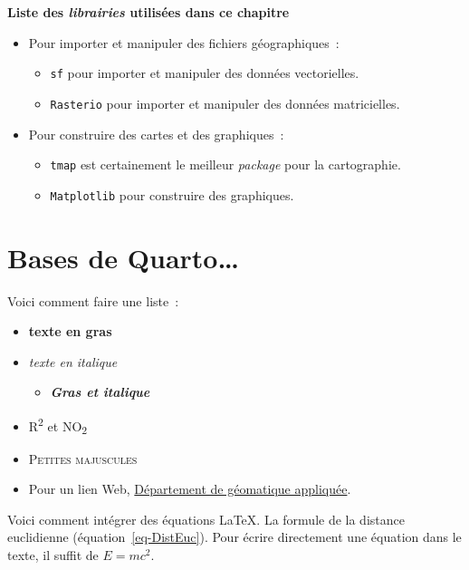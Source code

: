 \documentclass[
  letterpaper,
  DIV=11,
  numbers=noendperiod]{scrreprt}
\providecommand{\tightlist}{%
  \setlength{\itemsep}{0pt}\setlength{\parskip}{0pt}}\usepackage{longtable,booktabs,array}
\begin{document}
\textbf{Liste des \emph{librairies} utilisées dans ce chapitre}

\begin{itemize}
\tightlist
\item
  Pour importer et manipuler des fichiers géographiques~:

  \begin{itemize}
  \tightlist
  \item
    \texttt{sf} pour importer et manipuler des données vectorielles.
  \item
    \texttt{Rasterio} pour importer et manipuler des données
    matricielles.
  \end{itemize}
\item
  Pour construire des cartes et des graphiques~:

  \begin{itemize}
  \tightlist
  \item
    \texttt{tmap} est certainement le meilleur \emph{package} pour la
    cartographie.
  \item
    \texttt{Matplotlib} pour construire des graphiques.
  \end{itemize}
\end{itemize}

\section{Bases de Quarto\ldots{}}\label{sec-010}

Voici comment faire une liste~:

\begin{itemize}
\tightlist
\item
  \textbf{texte en gras}
\item
  \emph{texte en italique}

  \begin{itemize}
  \tightlist
  \item
    \textbf{\emph{Gras et italique}}
  \end{itemize}
\item
  R\textsuperscript{2} et NO\textsubscript{2}
\item
  \textsc{Petites majuscules}
\item
  Pour un lien Web,
  \href{https://www.usherbrooke.ca/geomatique/}{Département de
  géomatique appliquée}.
\end{itemize}

Voici comment intégrer des équations LaTeX. La formule de la distance
euclidienne (équation~\ref{eq-DistEuc}). Pour écrire directement une
équation dans le texte, il suffit de \(E = mc^2\).
\end{document}
